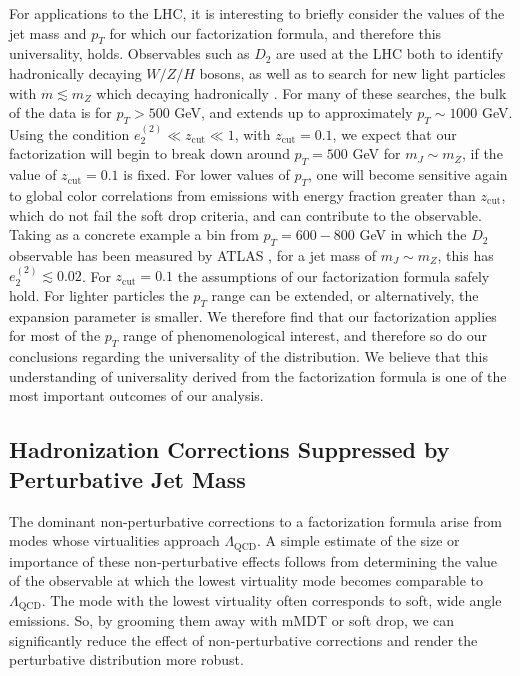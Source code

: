 \documentclass[a4paper,11pt]{article}
\newcommand{\ecf}[2]{e_{#1}^{(#2)}}
\def\zcut{z_{\text{cut}}}
\begin{document}
For applications to the LHC, it is interesting to briefly consider the values of the jet mass and $p_T$ for which our factorization formula, and therefore this universality, holds. Observables such as $D_2$ are used at the LHC both to identify hadronically decaying $W/Z/H$ bosons, as well as to search for new light particles with $m\lesssim m_Z$ which decaying hadronically  \cite{CMS-PAS-EXO-17-001}. For many of these searches, the bulk of the data is for $p_T>500$ GeV, and extends up to approximately $p_T\sim 1000$ GeV. Using the condition $\ecf{2}{2} \ll \zcut \ll 1$, with $\zcut=0.1$, we expect that our factorization will begin to break down around $p_T=500$ GeV for $m_J \sim m_Z$, if the value of $\zcut=0.1$ is fixed. For lower values of $p_T$, one will become sensitive again to global color correlations from emissions with energy fraction greater than $\zcut$, which do not fail the soft drop criteria, and can contribute to the observable.  Taking as a concrete example a bin from $p_T=600-800$ GeV in which the $D_2$ observable has been measured by ATLAS  \cite{collaboration:2015aa}, for a jet mass of $m_J \sim m_Z$, this has $\ecf{2}{2}\lesssim0.02$. For $\zcut=0.1$ the assumptions of our factorization formula safely hold. For lighter particles the $p_T$ range can be extended, or alternatively, the expansion parameter is smaller. We therefore find that our factorization applies for most of the $p_T$ range of phenomenological interest, and therefore so do our conclusions regarding the universality of the distribution. We believe that this understanding of universality derived from the factorization formula is one of the most important outcomes of our analysis.





\subsection{Hadronization Corrections Suppressed by Perturbative Jet Mass}\label{sec:hadr_suppress}



The dominant non-perturbative corrections to a factorization formula arise from modes whose virtualities approach $\Lambda_\text{QCD}$.  A simple estimate of the size or importance of these non-perturbative effects follows from determining the value of the observable at which the lowest virtuality mode becomes comparable to $\Lambda_\text{QCD}$.  The mode with the lowest virtuality often corresponds to soft, wide angle emissions.  So, by grooming them away with mMDT or soft drop, we can significantly reduce the effect of non-perturbative corrections and render the perturbative distribution more robust.
\end{document}
